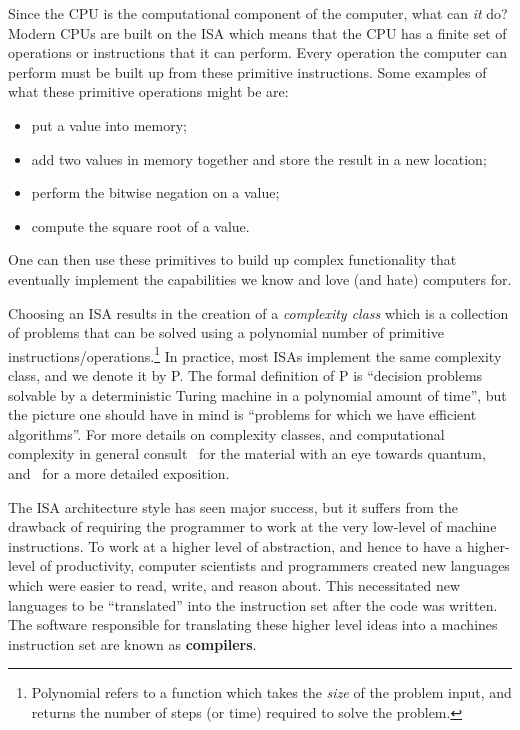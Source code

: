 Since the \ac{CPU} is the computational component of the computer, what can \emph{it} do?
Modern \acp{CPU} are built on the \ac{ISA} which means that the \ac{CPU} has a finite set of operations or instructions that it can perform.
Every operation the computer can perform must be built up from these primitive instructions.
Some examples of what these primitive operations might be are:
\begin{itemize}
    \item put a value into memory;
    \item add two values in memory together and store the result in a new location;
    \item perform the bitwise negation on a value;
    \item compute the square root of a value.
\end{itemize}
One can then use these primitives to build up complex functionality that eventually implement the capabilities we know and love (and hate) computers for.

Choosing an \ac{ISA} results in the creation of a \emph{complexity class} which is a collection of problems that can be solved using a polynomial number of primitive instructions/operations.\footnote{Polynomial refers to a function which takes the \emph{size} of the problem input, and returns the number of steps (or time) required to solve the problem.}
In practice, most \acp{ISA} implement the same complexity class, and we denote it by P. %
The formal definition of P is ``decision problems solvable by a deterministic Turing machine in a polynomial amount of time'', but the picture one should have in mind is ``problems for which we have efficient algorithms''.
For more details on complexity classes, and computational complexity in general consult~\cite[Chapter 3]{nielsenchuang} for the material with an eye towards quantum, and~\cite{complexity} for a more detailed exposition.

The \ac{ISA} architecture style has seen major success, but it suffers from the drawback of requiring the programmer to work at the very low-level of machine instructions.
To work at a higher level of abstraction, and hence to have a higher-level of productivity, computer scientists and programmers created new languages which were easier to read, write, and reason about.
This necessitated new languages to be ``translated'' into the instruction set after the code was written.
The software responsible for translating these higher level ideas into a machines instruction set are known as \textbf{compilers}.

